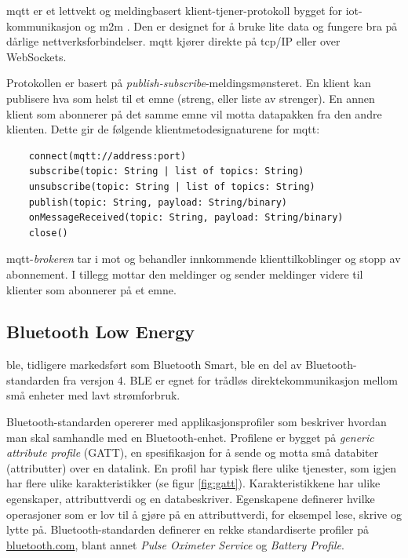 \gls{mqtt} er et lettvekt og meldingbasert klient-tjener-protokoll bygget for \gls{iot}-kommunikasjon
og \gls{m2m} \citep{mqtt_standard}. Den er designet for å bruke lite data og fungere bra på
dårlige nettverksforbindelser. \gls{mqtt} kjører direkte på \gls{tcp}/IP eller over WebSockets.

Protokollen er basert på \textit{publish-subscribe}-meldingsmønsteret. En klient kan publisere hva som helst til
et emne (streng, eller liste av strenger). En annen klient som abonnerer på det samme emne
vil motta datapakken fra den andre klienten. Dette gir de følgende klientmetodesignaturene for \gls{mqtt}:

\begin{verbatim}
    connect(mqtt://address:port)
    subscribe(topic: String | list of topics: String)
    unsubscribe(topic: String | list of topics: String)
    publish(topic: String, payload: String/binary)
    onMessageReceived(topic: String, payload: String/binary)
    close()
\end{verbatim}

\gls{mqtt}-\textit{brokeren} tar i mot og behandler innkommende klienttilkoblinger og stopp av abonnement. I tillegg
mottar den meldinger og sender meldinger videre til klienter som abonnerer på et emne.

\subsection{Bluetooth Low Energy}
\gls{ble}, tidligere markedsført som Bluetooth Smart, ble en del av Bluetooth-standarden fra versjon 4. BLE er egnet
for trådløs direktekommunikasjon mellom små enheter med lavt strømforbruk.

Bluetooth-standarden opererer med applikasjonsprofiler som beskriver hvordan man skal samhandle med
en Bluetooth-enhet. Profilene er bygget på \textit{generic attribute profile} (GATT), en spesifikasjon for å sende og motta
små databiter (attributter) over en datalink. %
En profil har typisk flere ulike tjenester, som igjen har flere ulike karakteristikker (se figur \ref{fig:gatt}).
Karakteristikkene har ulike egenskaper, attributtverdi og en databeskriver. Egenskapene definerer hvilke operasjoner som er lov
til å gjøre på en attributtverdi, for eksempel lese, skrive og lytte på. Bluetooth-standarden definerer en rekke standardiserte
profiler på \url{bluetooth.com}, blant annet \textit{Pulse Oximeter Service} og \textit{Battery Profile}.

